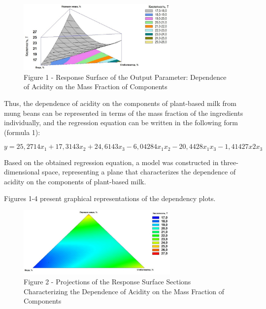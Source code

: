 \begin{figure}[H]
	\centering
	\includegraphics[width=0.7\textwidth]{media/pish/image5}
	\caption*{Figure 1 - Response Surface of the Output Parameter: Dependence
of Acidity on the Mass Fraction of Components}
\end{figure}

Thus, the dependence of acidity on the components of plant-based milk
from mung beans can be represented in terms of the mass fraction of the
ingredients individually, and the regression equation can be written in
the following form (formula 1):

\begin{equation}
y = 25,2714x_1 + 17,3143x_2+ 24,6143x_3- 6,04284x_1x_2- 20,4428x_1x_3- 1,41427x2x_3
\end{equation}

Based on the obtained regression equation, a model was constructed in
three-dimensional space, representing a plane that characterizes the
dependence of acidity on the components of plant-based milk.

Figures 1-4 present graphical representations of the dependency plots.

\begin{figure}[H]
	\centering
	\includegraphics[width=0.7\textwidth]{media/pish/image6}
	\caption*{Figure 2 - Projections of the Response Surface Sections
Characterizing the Dependence of Acidity on the Mass Fraction of
Components}
\end{figure}

